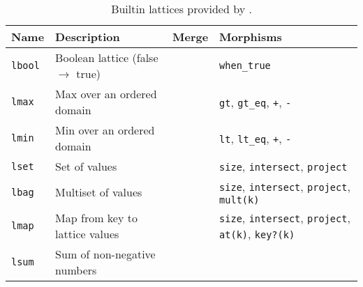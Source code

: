 \begin{table*}[t]
\begin{tabular}{|l|l|l|l|}
\hline
\textbf{Name} & \textbf{Description} & \textbf{Merge} & \textbf{Morphisms} \\
\hline
\texttt{lbool} & Boolean lattice (false $\to$ true) & & \texttt{when\_true} \\
\texttt{lmax} & Max over an ordered domain & &\texttt{gt},
\texttt{gt\_eq}, \texttt{+}, \texttt{-} \\
\texttt{lmin} & Min over an ordered domain & &\texttt{lt}, \texttt{lt\_eq},
\texttt{+}, \texttt{-} \\
\texttt{lset} & Set of values & &\texttt{size}, \texttt{intersect}, \texttt{project}
\\
\texttt{lbag} & Multiset of values & &\texttt{size}, \texttt{intersect},
\texttt{project}, \texttt{mult(k)}\\
\texttt{lmap} & Map from key to lattice values & &\texttt{size},
\texttt{intersect}, \texttt{project}, \texttt{at(k)}, \texttt{key?(k)} \\
\texttt{lsum} & Sum of non-negative numbers & &\\
\hline
\end{tabular}
\caption{Builtin lattices provided by \lang.}
\label{tbl:builtin-lattices}
\end{table*}
